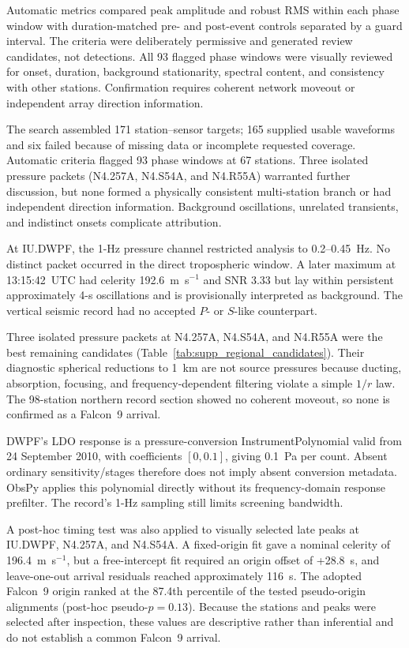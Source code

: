 \documentclass[]{seismica}
\begin{document}
Automatic metrics compared peak amplitude and robust RMS within each phase
window with duration-matched pre- and post-event controls separated by a guard
interval. The criteria were deliberately permissive and generated review
candidates, not detections. All 93 flagged phase windows were visually
reviewed for onset, duration, background stationarity, spectral content, and
consistency with other stations. Confirmation requires coherent network
moveout or independent array direction information.

The search assembled 171 station--sensor targets; 165 supplied usable
waveforms and six failed because of missing data or incomplete requested
coverage. Automatic criteria flagged 93 phase windows at 67 stations. Three
isolated pressure packets (N4.257A, N4.S54A, and N4.R55A) warranted further
discussion, but none formed a physically consistent multi-station branch or
had independent direction information. Background oscillations, unrelated
transients, and indistinct onsets complicate attribution.

At IU.DWPF, the 1-Hz pressure channel restricted analysis to 0.2--0.45~Hz. No
distinct packet occurred in the direct tropospheric window. A later maximum at
13:15:42~UTC had celerity 192.6~m~s$^{-1}$ and SNR 3.33 but lay within
persistent approximately 4-s oscillations and is provisionally interpreted as background. The
vertical seismic record had no accepted $P$- or $S$-like counterpart.

Three isolated pressure packets at N4.257A, N4.S54A, and N4.R55A were the best
remaining candidates (Table~\ref{tab:supp_regional_candidates}). Their
diagnostic spherical reductions to 1~km are not source pressures because
ducting, absorption, focusing, and frequency-dependent filtering violate a
simple $1/r$ law. The 98-station northern record section showed no coherent
moveout, so none is confirmed as a Falcon~9 arrival.

DWPF's LDO response is a pressure-conversion InstrumentPolynomial valid from
24 September 2010, with coefficients $[0,0.1]$, giving 0.1~Pa per count.
Absent ordinary sensitivity/stages therefore does not imply absent conversion
metadata. ObsPy applies this polynomial directly without its frequency-domain
response prefilter. The record's 1-Hz sampling still limits screening bandwidth.

A post-hoc timing test was also applied to visually selected late peaks at
IU.DWPF, N4.257A, and N4.S54A. A fixed-origin fit gave a nominal celerity of
196.4~m~s$^{-1}$, but a free-intercept fit required an origin offset of
+28.8~s, and leave-one-out arrival residuals reached approximately 116~s. The
adopted Falcon~9 origin ranked at the 87.4th percentile of the tested
pseudo-origin alignments (post-hoc pseudo-$p=0.13$). Because the stations and
peaks were selected after inspection, these values are descriptive rather
than inferential and do not establish a common Falcon~9 arrival.
\end{document}
